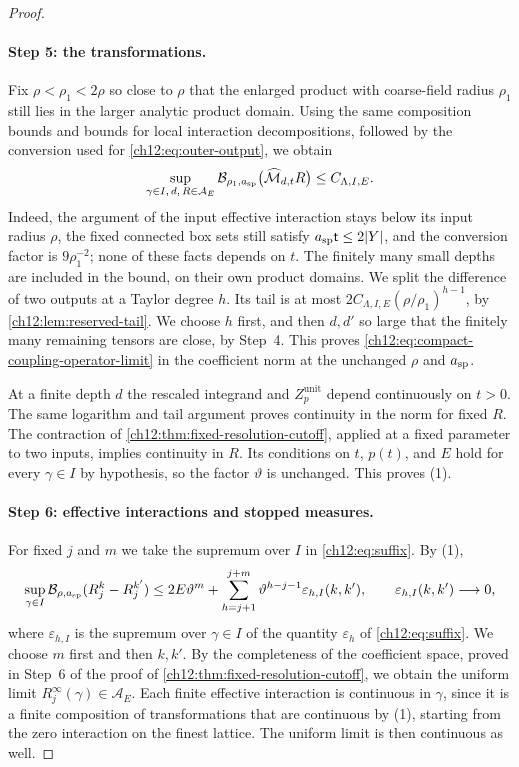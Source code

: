 \begin{proof}
\paragraph{Step 5: the transformations.}
Fix $\rho<\rho_1<2\rho$ so close to $\rho$ that the enlarged product with coarse-field radius $\rho_1$ still lies in the larger analytic product domain. Using the same composition bounds and bounds for local interaction decompositions, followed by the conversion used for \eqref{ch12:eq:outer-output}, we obtain
\begin{equation}\label{ch12:eq:compact-coupling-outer-output}
 \sup_{\gamma\in I,\,d,\,R\in\mathcal A_E}\mathcal B_{\rho_1,a_{\mathrm{sp}}}\bigl(\widehat{\mathcal M}_{d,t}R\bigr)\le C_{\Lambda,I,E}.
\end{equation}
Indeed, the argument of the input effective interaction stays below its input radius $\rho$, the fixed connected box sets still satisfy $a_{\mathrm{sp}}\mathsf t\le2\lvert Y\rvert$, and the conversion factor is $9\rho_1^{-2}$; none of these facts depends on $t$. The finitely many small depths are included in the bound, on their own product domains. We split the difference of two outputs at a Taylor degree $h$. Its tail is at most $2C_{\Lambda,I,E}(\rho/\rho_1)^{h-1}$, by \cref{ch12:lem:reserved-tail}. We choose $h$ first, and then $d,d'$ so large that the finitely many remaining tensors are close, by Step~4. This proves \eqref{ch12:eq:compact-coupling-operator-limit} in the coefficient norm at the unchanged $\rho$ and $a_{\mathrm{sp}}$.

At a finite depth $d$ the rescaled integrand and $Z_p^{\mathrm{unit}}$ depend continuously on $t>0$. The same logarithm and tail argument proves continuity in the norm for fixed $R$. The contraction of \cref{ch12:thm:fixed-resolution-cutoff}, applied at a fixed parameter to two inputs, implies continuity in $R$. Its conditions on $t$, $p(t)$, and $E$ hold for every $\gamma\in I$ by hypothesis, so the factor $\vartheta$ is unchanged. This proves (1).

\paragraph{Step 6: effective interactions and stopped measures.}
For fixed $j$ and $m$ we take the supremum over $I$ in \eqref{ch12:eq:suffix}. By (1),
\begin{equation}\label{ch12:eq:compact-coupling-suffix}
 \sup_{\gamma\in I}\mathcal B_{\rho,a_{\mathrm{sp}}}(R_j^k-R_j^{k'})\le2E\vartheta^m+\sum_{h=j+1}^{j+m}\vartheta^{h-j-1}\varepsilon_{h,I}(k,k'),\qquad \varepsilon_{h,I}(k,k')\longrightarrow0,
\end{equation}
where $\varepsilon_{h,I}$ is the supremum over $\gamma\in I$ of the quantity $\varepsilon_h$ of \eqref{ch12:eq:suffix}. We choose $m$ first and then $k,k'$. By the completeness of the coefficient space, proved in Step~6 of the proof of \cref{ch12:thm:fixed-resolution-cutoff}, we obtain the uniform limit $R_j^\infty(\gamma)\in\mathcal A_E$. Each finite effective interaction is continuous in $\gamma$, since it is a finite composition of transformations that are continuous by (1), starting from the zero interaction on the finest lattice. The uniform limit is then continuous as well.


\end{proof}
